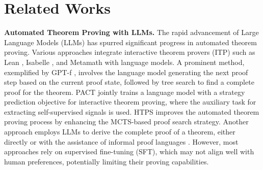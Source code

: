 \section{Related Works}
\textbf{Automated Theorem Proving with LLMs.}
The rapid advancement of Large Language Models (LLMs) 
has spurred significant progress in automated theorem proving.
Various approaches integrate interactive theorem provers (ITP) such as 
Lean \cite{de2015lean}, Isabelle \cite{paulson1990isabelle}, and Metamath \cite{megill2019metamath} with language models. 
A prominent method, exemplified by GPT-f \cite{polu2020gpt-f}, involves the language model generating the next proof step based on the current proof state, followed by tree search to find a complete proof for the theorem. 
PACT \cite{han2021PACT} jointly trains a language model with a strategy prediction objective for interactive theorem proving, where the auxiliary task for extracting self-supervised signals is used. 
HTPS \cite{lample2022hypertree} improves the automated theorem proving process by enhancing the MCTS-based proof search strategy. 
Another approach employs LLMs to derive the complete proof of a theorem, either directly or with the assistance of informal proof languages \cite{jiang2022dsp,lin2024leanstar,wang2023lego}. %
However, most approaches rely on supervised fine-tuning (SFT), which may not align well with human preferences, potentially limiting their proving capabilities.



